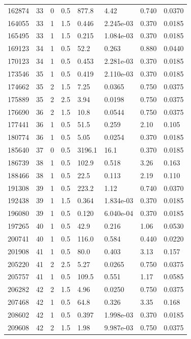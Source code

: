 \documentclass[preview]{standalone}
\begin{document}
{{{\begin{tabular}{L{1.2cm}C{1.2cm} C{0.3cm}C{0.5cm} C{1.4cm}C{1.4cm} C{1.4cm}C{1.4cm}}
  162874  &    33  & 0     & 0.5 &  877.8  & 4.42  & 0.740 &  0.0370   \\ 
  164055  &    33  & 1     & 1.5 &  0.446  & 2.245e-03  & 0.370 &  0.0185   \\ 
  165495  &    33  & 1     & 1.5 &  0.215  & 1.084e-03  & 0.370 &  0.0185   \\ 
  169123  &    34  & 1     & 0.5 &  52.2  & 0.263  & 0.880 &  0.0440   \\ 
  170123  &    34  & 1     & 0.5 &  0.453  & 2.281e-03  & 0.370 &  0.0185   \\ 
  173546  &    35  & 1     & 0.5 &  0.419  & 2.110e-03  & 0.370 &  0.0185   \\ 
  174662  &    35  & 2     & 1.5 &  7.25  & 0.0365  & 0.750 &  0.0375   \\ 
  175889  &    35  & 2     & 2.5 &  3.94  & 0.0198  & 0.750 &  0.0375   \\ 
  176690  &    36  & 2     & 1.5 &  10.8  & 0.0544  & 0.750 &  0.0375   \\ 
  177441  &    36  & 1     & 0.5 &  51.5  & 0.259  & 2.10 &  0.105   \\ 
  180774  &    36  & 1     & 0.5 &  5.05  & 0.0254  & 0.370 &  0.0185   \\ 
  185640  &    37  & 0     & 0.5 &  3196.1  & 16.1  & 0.370 &  0.0185   \\ 
  186739  &    38  & 1     & 0.5 &  102.9  & 0.518  & 3.26 &  0.163   \\ 
  188466  &    38  & 1     & 0.5 &  22.5  & 0.113  & 2.19 &  0.110   \\ 
  191308  &    39  & 1     & 0.5 &  223.2  & 1.12  & 0.740 &  0.0370   \\ 
  192438  &    39  & 1     & 1.5 &  0.364  & 1.834e-03  & 0.370 &  0.0185   \\ 
  196080  &    39  & 1     & 0.5 &  0.120  & 6.040e-04  & 0.370 &  0.0185   \\ 
  197265  &    40  & 1     & 0.5 &  42.9  & 0.216  & 1.06 &  0.0530   \\ 
  200741  &    40  & 1     & 0.5 &  116.0  & 0.584  & 0.440 &  0.0220   \\ 
  201908  &    41  & 1     & 0.5 &  80.0  & 0.403  & 3.13 &  0.157   \\ 
  205220  &    41  & 2     & 2.5 &  5.27  & 0.0265  & 0.750 &  0.0375   \\ 
  205757  &    41  & 1     & 0.5 &  109.5  & 0.551  & 1.17 &  0.0585   \\ 
  206282  &    42  & 2     & 1.5 &  4.96  & 0.0250  & 0.750 &  0.0375   \\ 
  207468  &    42  & 1     & 0.5 &  64.8  & 0.326  & 3.35 &  0.168   \\ 
  208602  &    42  & 1     & 0.5 &  0.397  & 1.998e-03  & 0.370 &  0.0185   \\ 
  209608  &    42  & 2     & 1.5 &  1.98  & 9.987e-03  & 0.750 &  0.0375   \\ 
\hline 
\end{tabular} 

}}}
\end{document}
